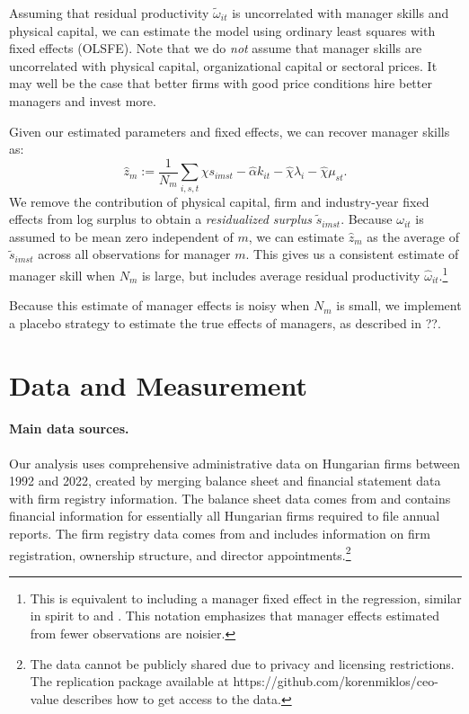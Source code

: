 \documentclass[11pt,a4paper]{article}
\begin{document}
Assuming that residual productivity $\tilde\omega_{it}$ is uncorrelated with manager skills and physical capital, we can estimate the model using ordinary least squares with fixed effects (OLSFE). Note that we do \emph{not} assume that manager skills are uncorrelated with physical capital, organizational capital or sectoral prices. It may well be the case that better firms with good price conditions hire better managers and invest more. 

Given our estimated parameters and fixed effects, we can recover manager skills as:
\begin{equation}\label{eq:estimated}
\hat z_m :=
\frac1{N_m}\sum_{i,s,t}\hat\chi s_{imst} -  \hat\alpha k_{it}  -\hat\chi \lambda_i -\hat\chi \mu_{st}. 
\end{equation}
We remove the contribution of physical capital, firm and industry-year fixed effects from log surplus to obtain a \emph{residualized surplus} $\tilde s_{imst}$. Because $\omega_{it}$ is assumed to be mean zero independent of $m$, we can estimate $\hat z_m$ as the average of $\tilde s_{imst}$ across all observations for manager $m$. This gives us a consistent estimate of manager skill when $N_m$ is large, but includes average residual productivity $\hat\omega_{it}$.\footnote{This is equivalent to including a manager fixed effect in the regression, similar in spirit to \citet{Abowd1999Econometrica} and \citet{Card2018JoLE}. This notation emphasizes that manager effects estimated from fewer observations are noisier.}

Because this estimate of manager effects is noisy when $N_m$ is small, we implement a placebo strategy to estimate the true effects of managers, as described in ??.

\section{Data and Measurement}
\paragraph{Main data sources.} Our analysis uses comprehensive administrative data on Hungarian firms between 1992 and 2022, created by merging balance sheet and financial statement data with firm registry information. The balance sheet data comes from \citet{merleg2024} and contains financial information for essentially all Hungarian firms required to file annual reports. The firm registry data comes from \citet{cegjegyzek2024} and includes information on firm registration, ownership structure, and director appointments.\footnote{The data cannot be publicly shared due to privacy and licensing restrictions. The replication package available at https://github.com/korenmiklos/ceo-value describes how to get access to the data.}
\end{document}
